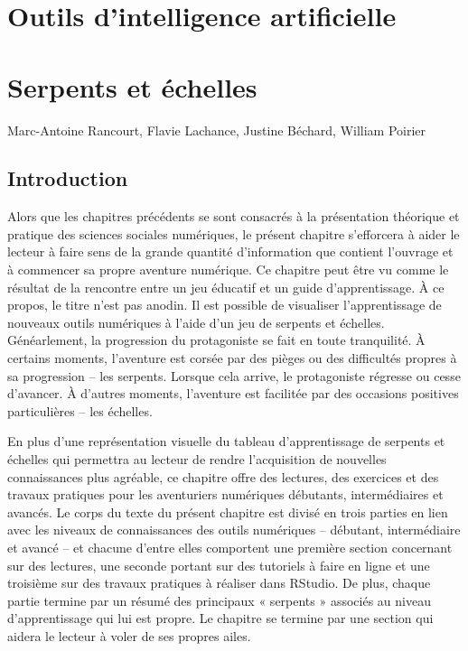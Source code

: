 \documentclass[
  letterpaper,
]{scrbook}
\begin{document}

\hypertarget{outils-dintelligence-artificielle}{%
\chapter{Outils d'intelligence
artificielle}\label{outils-dintelligence-artificielle}}


\hypertarget{serpents-et-uxe9chelles}{%
\chapter{Serpents et échelles}\label{serpents-et-uxe9chelles}}

\begin{center}

Marc-Antoine Rancourt, Flavie Lachance, Justine Béchard, William Poirier

\end{center}

\hypertarget{introduction-2}{%
\section{Introduction}\label{introduction-2}}

Alors que les chapitres précédents se sont consacrés à la présentation
théorique et pratique des sciences sociales numériques, le présent
chapitre s'efforcera à aider le lecteur à faire sens de la grande
quantité d'information que contient l'ouvrage et à commencer sa propre
aventure numérique. Ce chapitre peut être vu comme le résultat de la
rencontre entre un jeu éducatif et un guide d'apprentissage. À ce
propos, le titre n'est pas anodin. Il est possible de visualiser
l'apprentissage de nouveaux outils numériques à l'aide d'un jeu de
serpents et échelles. Généarlement, la progression du protagoniste se
fait en toute tranquilité. À certains moments, l'aventure est corsée par
des pièges ou des difficultés propres à sa progression -- les serpents.
Lorsque cela arrive, le protagoniste régresse ou cesse d'avancer. À
d'autres moments, l'aventure est facilitée par des occasions positives
particulières -- les échelles.

En plus d'une représentation visuelle du tableau d'apprentissage de
serpents et échelles qui permettra au lecteur de rendre l'acquisition de
nouvelles connaissances plus agréable, ce chapitre offre des lectures,
des exercices et des travaux pratiques pour les aventuriers numériques
débutants, intermédiaires et avancés. Le corps du texte du présent
chapitre est divisé en trois parties en lien avec les niveaux de
connaissances des outils numériques -- débutant, intermédiaire et avancé
-- et chacune d'entre elles comportent une première section concernant
sur des lectures, une seconde portant sur des tutoriels à faire en ligne
et une troisième sur des travaux pratiques à réaliser dans RStudio. De
plus, chaque partie termine par un résumé des principaux « serpents »
associés au niveau d'apprentissage qui lui est propre. Le chapitre se
termine par une section qui aidera le lecteur à voler de ses propres
ailes.
\end{document}
